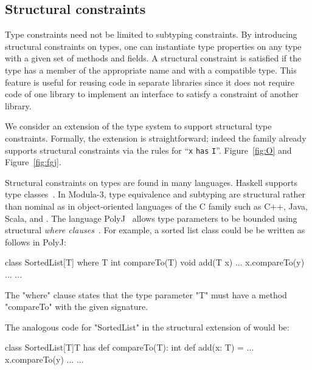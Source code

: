\subsection{Structural constraints}
\label{sec:structural}
\label{sec:structural-typing}

Type constraints need not be limited to subtyping constraints.
By introducing structural constraints on types, one can
instantiate
type properties on any type with a given set
of methods and fields.
A structural constraint is satisfied if the type has a member of
the appropriate name and with a compatible type.
This feature is useful for reusing code
in separate libraries since it does not require
code of one library to implement an interface to satisfy a
constraint of another library.

We consider an extension of the \Xten{} type system
to support structural type constraints.  Formally, the extension
is straightforward; indeed the \FX{} family already supports structural
constraints
via the rules for ``{\tt x} {\tt has} {\tt I}''.
Figure~\ref{fig:O} and Figure~\ref{fig:fgj}.

Structural constraints on types are found in many languages.
Haskell supports type
classes~\cite{haskell,haskell-type-classes}.
%
In Modula-3, type equivalence and subtyping are structural
rather than nominal as in object-oriented languages of the C
family such as C++, Java, Scala, and \Xten{}.
%
The language PolyJ~\cite{java-popl97} allows type parameters to be
bounded using
structural \emph{where clauses}~\cite{where-clauses}.
For example, a sorted list class %
could be
be written as follows in PolyJ:
{\footnotesize
\begin{xten}
class SortedList[T] where T {int compareTo(T)} {
    void add(T x) { ... x.compareTo(y) ... }
    ...
}
\end{xten}}
The \xcd"where" clause states that the type parameter \xcd"T" must have a
method \xcd"compareTo" with the given signature.

The analogous code for \xcd"SortedList" in the structural
extension of \Xten{} would be:
{\footnotesize
\begin{xten}
class SortedList[T]{T has def compareTo(T): int} {
    def add(x: T) = { ... x.compareTo(y) ... }
    ...
}
\end{xten}}


